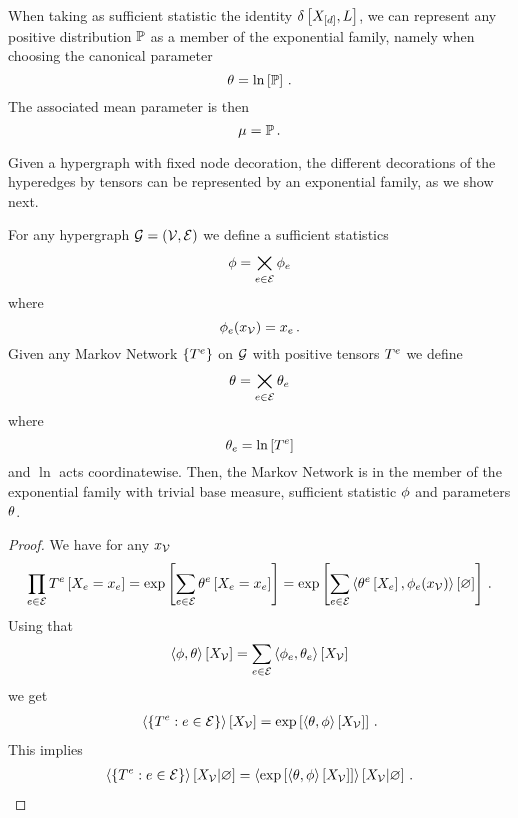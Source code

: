 \begin{example}\label{exa:naiveExpFamily}
	When taking as sufficient statistic the identity $\delta\left[X_{[d]},L\right]$, we can represent any positive distribution $\mathbb{P}$ as a member of the exponential family, namely when choosing the canonical parameter
		\[ \theta = \ln \left[ \mathbb{P} \right] \, . \]
	The associated mean parameter is then
		\[ \mu = \mathbb{P} \, . \]
\end{example}


Given a hypergraph with fixed node decoration, the different decorations of the hyperedges by tensors can be represented by an exponential family, as we show next.

\begin{theorem}
	For any hypergraph $\mathcal{G}=(\mathcal{V},\mathcal{E})$ we define a sufficient statistics 
		\[ \phi = \bigtimes_{e\in\mathcal{E}}  \phi_{e} \]
	where 
		\[ \phi_{e}(x_{\mathcal{V}}) = x_{e} \, . \]
	Given any Markov Network $\{T^{e}\}$ on $\mathcal{G}$ with positive tensors $T^{e}$ we define
		\[ \theta = \bigtimes_{e\in\mathcal{E}} \theta_{e} \]
	where
		\[ \theta_{e} =  \ln\left[ T^{e} \right] \]
	and $\ln$ acts coordinatewise.
	Then, the Markov Network is in the member of the exponential family with trivial base measure, sufficient statistic $\phi$ and parameters $\theta$.
\end{theorem}
\begin{proof}
	We have for any $x_{\mathcal{V}}$
	\begin{align}
	\prod_{e\in\mathcal{E}} T^{e}\left[X_{e}=x_{e}\right]
		= \mathrm{exp}\left[\sum_{e\in\mathcal{E}} \theta^{e}\left[X_{e}=x_{e}\right]\right]
		= \mathrm{exp}\left[\sum_{e\in\mathcal{E}} \left\langle \theta^{e}\left[X_{e}\right],\phi_{e}(x_{\mathcal{V}})\right\rangle \left[ \varnothing \right]\right]  \, .
	\end{align}
	Using that
		\[ \left\langle \phi,\theta\right\rangle \left[ X_{\mathcal{V}} \right] = \sum_{e\in\mathcal{E}} \left\langle \phi_{e},\theta_{e}\right\rangle \left[ X_{\mathcal{V}} \right] \]
	we get
	\begin{align}
		\left\langle \{T^{e}: e\in\mathcal{E}\}\right\rangle \left[ X_{\mathcal{V}} \right] = \mathrm{exp}\left[\left\langle \theta,\phi\right\rangle \left[ X_{\mathcal{V}} \right]\right] \, .
	\end{align}
	This implies 
	\begin{align}
		\left\langle \{T^{e}: e\in\mathcal{E}\}\right\rangle \left[ X_{\mathcal{V}} | \varnothing \right] = \left\langle \mathrm{exp}\left[\left\langle \theta,\phi\right\rangle \left[ X_{\mathcal{V}} \right]\right]\right\rangle \left[ X_{\mathcal{V}} | \varnothing \right] \, .
	\end{align}
\end{proof}


